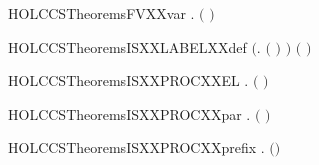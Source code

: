 \newcommand{\HOLCCSTheoremsFVXXsum}{\UseVerbatim{HOLCCSTheoremsFVXXsum}}
\begin{SaveVerbatim}{HOLCCSTheoremsFVXXvar}
\HOLTokenTurnstile{} \HOLSymConst{\HOLTokenForall{}}.  \ensuremath{(} \ensuremath{)} \HOLSymConst{\ensuremath{=}} \HOLTokenLeftbrace{}\HOLTokenRightbrace{}
\end{SaveVerbatim}
\newcommand{\HOLCCSTheoremsFVXXvar}{\UseVerbatim{HOLCCSTheoremsFVXXvar}}
\begin{SaveVerbatim}{HOLCCSTheoremsISXXLABELXXdef}
\HOLTokenTurnstile{} \ensuremath{(}\HOLSymConst{\HOLTokenForall{}}.  \ensuremath{(} \ensuremath{)} \HOLSymConst{\HOLTokenEquiv{}} \ensuremath{)} \HOLSymConst{\HOLTokenConj{}} \ensuremath{(} \HOLConst{\ensuremath{\tau}} \HOLSymConst{\HOLTokenEquiv{}} \ensuremath{)}
\end{SaveVerbatim}
\newcommand{\HOLCCSTheoremsISXXLABELXXdef}{\UseVerbatim{HOLCCSTheoremsISXXLABELXXdef}}
\begin{SaveVerbatim}{HOLCCSTheoremsISXXPROCXXEL}
\HOLTokenTurnstile{} \HOLSymConst{\HOLTokenForall{}} .   \HOLSymConst{\HOLTokenConj{}}  \HOLSymConst{\HOLTokenLt{}}   \HOLSymConst{\HOLTokenImp{}}  \ensuremath{(}  \ensuremath{)}
\end{SaveVerbatim}
\newcommand{\HOLCCSTheoremsISXXPROCXXEL}{\UseVerbatim{HOLCCSTheoremsISXXPROCXXEL}}
\begin{SaveVerbatim}{HOLCCSTheoremsISXXPROCXXpar}
\HOLTokenTurnstile{} \HOLSymConst{\HOLTokenForall{}} .  \ensuremath{(} \HOLSymConst{\ensuremath{\mid}} \ensuremath{)} \HOLSymConst{\HOLTokenEquiv{}}   \HOLSymConst{\HOLTokenConj{}}  
\end{SaveVerbatim}
\newcommand{\HOLCCSTheoremsISXXPROCXXpar}{\UseVerbatim{HOLCCSTheoremsISXXPROCXXpar}}
\begin{SaveVerbatim}{HOLCCSTheoremsISXXPROCXXprefix}
\HOLTokenTurnstile{} \HOLSymConst{\HOLTokenForall{}} .  \ensuremath{(}\HOLSymConst{\ensuremath{\ldotp}}\ensuremath{)} \HOLSymConst{\HOLTokenEquiv{}}  
\end{SaveVerbatim}
